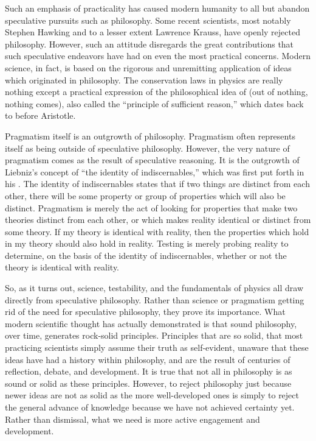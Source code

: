 Such an emphasis of practicality has caused modern humanity to all but abandon speculative pursuits such as philosophy.  
Some recent scientists, most notably Stephen Hawking and to a lesser extent Lawrence Krauss, have openly rejected philosophy.\citep{warman2011}\citep{andersen2012}  
However, such an attitude disregards the great contributions that such speculative endeavors have had on even the most practical concerns.  Modern science, in fact, is based on the rigorous and unremitting application of ideas which originated in philosophy.  The conservation laws in physics are really nothing except a practical expression of the philosophical idea of  (out of nothing, nothing comes), also called the ``principle of sufficient reason,'' which dates back to before Aristotle.\citep{psr2011}

Pragmatism itself is an outgrowth of philosophy.  Pragmatism often represents itself as being outside of speculative philosophy.  However, the very nature of pragmatism comes as the result of speculative reasoning.  It is the outgrowth of Liebniz's concept of ``the identity of indiscernables,'' which was first put forth in his .\citep{ident2012}  The identity of indiscernables states that if two things are distinct from each other, there will be some property or group of properties which will also be distinct.  Pragmatism is merely the act of looking for properties that make two theories distinct from each other, or which makes reality identical or distinct from some theory.  If my theory is identical with reality, then the properties which hold in my theory should also hold in reality.  Testing is merely probing reality to determine, on the basis of the identity of indiscernables, whether or not the theory is identical with reality.

So, as it turns out, science, testability, and the fundamentals of physics all draw directly from speculative philosophy.  Rather than science or pragmatism getting rid of the need for speculative philosophy, they prove its importance.  What modern scientific thought has actually demonstrated is that sound philosophy, over time, generates rock-solid principles.  Principles that are so solid, that most practicing scientists simply assume their truth as self-evident, unaware that these ideas have had a history within philosophy, and are the result of centuries of reflection, debate, and development.  It is true that not all in philosophy is as sound or solid as these principles.  However, to reject philosophy just because newer ideas are not as solid as the more well-developed ones is simply to reject the general advance of knowledge because we have not achieved certainty yet.  Rather than dismissal, what we need is more active engagement and development.

